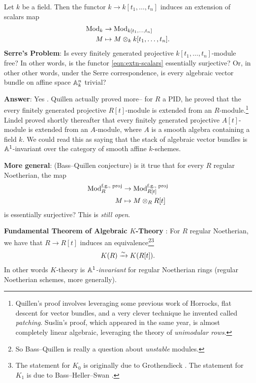 \documentclass[11pt,openany]{book}
\begin{document}
\begin{example} Let $k$ be a field. Then the functor $k \to k[t_1, \ldots, t_n]$ induces an extension of scalars map
\begin{equation}\label{eqn:extn-scalars}
\begin{aligned}
    \mathrm{Mod}_k &\to \mathrm{Mod}_{k[t_1, \ldots, t_n]} \\
    M &\mapsto M \otimes_k k[t_1, \ldots, t_n].
\end{aligned}
\end{equation}
\textbf{Serre's Problem}: Is every finitely generated projective $k[t_1, \ldots, t_n]$-module free? In other words, is the functor \autoref{eqn:extn-scalars} essentially surjective? Or, in other other words, under the Serre correspondence, is every algebraic vector bundle on affine space $\mathbb{A}^n_k$ trivial?

\textbf{Answer}: Yes \cite{Quillen76,Suslin76}. Quillen actually proved more-- for $R$ a PID, he proved that the every finitely generated projective $R[t]$-module is extended from an $R$-module.\footnote{%
Quillen's proof involves leveraging some previous work of Horrocks, flat descent for vector bundles, and a very clever technique he invented called \textit{patching}. Suslin's proof, which appeared in the same year, is almost completely linear algebraic, leveraging the theory of \textit{unimodular rows}.} Lindel proved shortly thereafter that every finitely generated projective $A[t]$-module is extended from an $A$-module, where $A$ is a smooth algebra containing a field $k$. We could read this as saying that the stack of algebraic vector bundles is $\mathbb{A}^1$-invariant over the category of smooth affine $k$-schemes.
\end{example}

\textbf{More general}: (Bass--Quillen conjecture) is it true that for every $R$ regular Noetherian, the map
\begin{align*}
    \mathrm{Mod}_R^{\text{f.g., proj}} &\to \mathrm{Mod}_{R[t]}^{\text{f.g., proj}} \\
    M &\mapsto M \otimes_R R[t]
\end{align*}
is essentially surjective? This is \textit{still open}.

\textbf{Fundamental Theorem of Algebraic $K$-Theory} \cite{Quillen-K1}: For $R$ regular Noetherian, we have that $R \to R[t]$ induces an equivalence\footnote{%
So Bass--Quillen is really a question about \textit{unstable} modules.}\footnote{%
The statement for $K_0$ is originally due to Grothendieck \cite[5.6.1.3]{Asok-A1AG}. The statement for $K_1$ is due to Bass--Heller--Swan \cite[5.8.2.1]{Asok-A1AG}.
}
\begin{align*}
    K(R) \xrightarrow{\sim} K(R[t]).
\end{align*}
%
In other words $K$-theory is \textit{$\mathbb{A}^1$-invariant} for regular Noetherian rings (regular Noetherian schemes, more generally).
\end{document}
